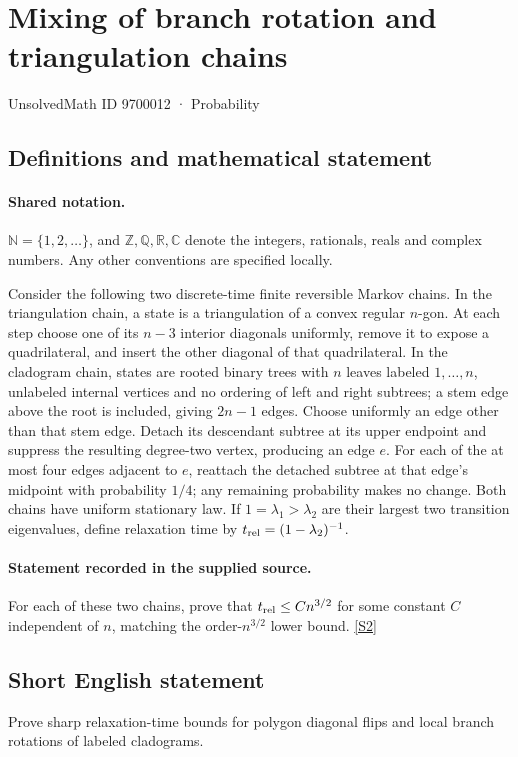 \documentclass[11pt]{article}
\newcommand{\sref}[2]{\hyperlink{source:#1:#2}{[S#2]}}
\begin{document}
\setcounter{section}{9700011}
\section{Mixing of branch rotation and triangulation chains}\label{9700012}
{\small\sffamily UnsolvedMath ID 9700012 · Probability}
\subsection{Definitions and mathematical statement}

\paragraph{Shared notation.}$\mathbb N=\{1,2,\ldots\}$, and $\mathbb Z,\mathbb Q,\mathbb R,\mathbb C$ denote the integers, rationals, reals and complex numbers. Any other conventions are specified locally.


Consider the following two discrete-time finite reversible Markov chains. In the triangulation chain, a state is a triangulation of a convex regular $n$-gon. At each step choose one of its $n-3$ interior diagonals uniformly, remove it to expose a quadrilateral, and insert the other diagonal of that quadrilateral.
In the cladogram chain, states are rooted binary trees with $n$ leaves labeled $1,\ldots,n$, unlabeled internal vertices and no ordering of left and right subtrees; a stem edge above the root is included, giving $2n-1$ edges. Choose uniformly an edge other than that stem edge. Detach its descendant subtree at its upper endpoint and suppress the resulting degree-two vertex, producing an edge $e$. For each of the at most four edges adjacent to $e$, reattach the detached subtree at that edge's midpoint with probability $1/4$; any remaining probability makes no change. Both chains have uniform stationary law. If $1=\lambda_1>\lambda_2$ are their largest two transition eigenvalues, define relaxation time by $t_{\rm rel}=(1-\lambda_2)^{-1}$.
\paragraph{Statement recorded in the supplied source.}
For each of these two chains, prove that $t_{\rm rel}\le Cn^{3/2}$ for some constant $C$ independent of $n$, matching the order-$n^{3/2}$ lower bound. \sref{9700012}{2}
\subsection{Short English statement}
Prove sharp relaxation-time bounds for polygon diagonal flips and local branch rotations of labeled cladograms.
\end{document}
